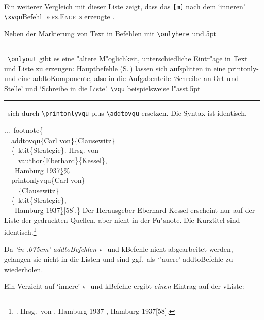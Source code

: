 \documentclass[12pt,a4paper]{article}
\newcommand{\pdfko}[1]{\kern #1pt
                              \rule[-0.4ex]{0.8pt}{0ex}\kern -0.8pt
                          \strut\ignorespaces}%
\newcommand{\pbs}{\string\ \unskip}
\newcommand{\bs}{\protect\pbs}
\begin{document}
Ein weiterer Vergleich mit dieser Liste zeigt, dass das 
\verb|[m]| nach dem `inneren' \verb|\xvqu|\hy Befehl 
\hspace{.1em}\textsc{ders.\baslash Engels} \hspace{.1em}erzeugte .

Neben der Markierung von Text in \BibArts\hy Befehlen mit 
\hspace{-.1em}\verb|\onlyhere| und\pdfko{.5}\ 
\hspace{-.1em}\verb|\onlyout| gibt es eine "altere M"oglichkeit, 
unterschiedliche Eintr"age in Text und Liste zu erzeugen: \BibArts\hy 
Hauptbefehle (S.\,\pageref{Hauptbefehle}) lassen sich aufsplitten in 
eine printonly- und eine addto\hy Komponente, also in die 
Aufgabenteile `Schreibe an Ort und Stelle' und `Schreibe in die Liste'. 
\label{printonly} \verb|\vqu| beispielsweise l"asst\pdfko{.5}\ 
sich durch \verb|\printonlyvqu| \hspace{.05em}plus 
\hspace{-.1em}\verb|\addtovqu| ersetzen. Die Syntax ist identisch.

\Doppelbox
{...\bs footnote\{
 \\ \ \bs addtovqu\{Carl von\}\{Clausewitz\}
 \\ \ \ \b{\b{\{}}\bs ktit\{Strategie\}. Hrsg. von 
 \\ \ \ \ \bs vauthor\{Eberhard\}\{Kessel\}, 
 \\ \ \ \ Hamburg 1937\b{\b{\}}}\%
 \\[.2ex] \ \bs printonlyvqu\{Carl von\}
 \\ \ \ \ \ \{Clausewitz\}
 \\ \ \ \b{\{}\bs ktit\{Strategie\}, 
 \\ \ \ \ Hamburg 1937\b{\}}[58].\}
}
{Der Herausgeber Eberhard Kessel erscheint
 nur auf der Liste der gedruckten Quellen,
 aber nicht in der Fu"snote. Die Kurztitel
 sind identisch.\footnote{
 \addtovqu{Carl von}{Clausewitz}
  {. Hrsg.\ von 
         , 
         Hamburg 1937}%
  {, 
         Hamburg 1937}[58].}
}

\noindent
Da \hspace{-.05em}\textit{`in\kern-.075em' addto\hy Befehlen} v- und k\fhy Befehle nicht abgearbeitet 
werden, gelangen sie nicht in die Listen und sind
ggf.\ als `"au\hyss ere' addto\hy Befehle zu wiederholen. 

\vspace{.75ex}\noindent
Ein Verzicht auf \hspace{.02em}`innere' \hspace{-.02em}v- und k\fhy Befehle ergibt \textit{einen} Eintrag auf der v\fhy Liste:
\end{document}
